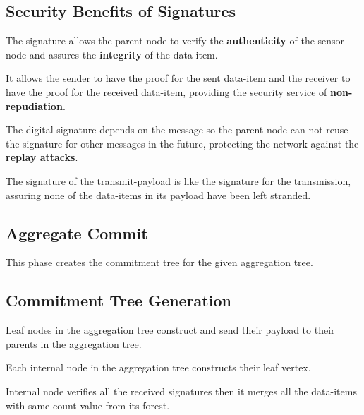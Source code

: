 \documentclass[%
  slidesonly,%
  semlayer%
  ]{seminar}                                  %
\begin{document}
\begin{slide}
    \subsection*{Security Benefits of Signatures}
      \vfill
      The signature allows the parent node to verify the \textbf{authenticity} of the sensor node and assures the \textbf{integrity} of the data-item.

      It allows the sender to have the proof for the sent data-item and the receiver to have the proof for the received data-item, providing the security service of \textbf{non-repudiation}.

      The digital signature depends on the message so the parent node can not reuse the signature for other messages in the future, protecting the network against the \textbf{replay attacks}.

      The signature of the transmit-payload is like the signature for the transmission, assuring none of the data-items in its payload have been left stranded.

      \vfill
      \clearpage

    \subsection*{Aggregate Commit}
      \vfill
      This phase creates the commitment tree for the given aggregation tree.

    \subsection*{Commitment Tree Generation}
    
      Leaf nodes in the aggregation tree construct and send their payload to their parents in the aggregation tree.  
      
      Each internal node in the aggregation tree constructs their leaf vertex.
  
      Internal node verifies all the received signatures then it merges all the data-items with same count value from its forest.


\end{slide}
\end{document}
